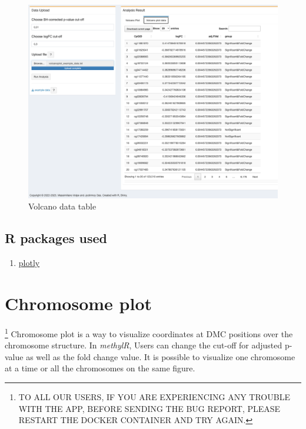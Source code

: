 \documentclass[
  a4paper,
  oneside,
  open=any]{scrreport}
\providecommand{\tightlist}{%
  \setlength{\itemsep}{0pt}\setlength{\parskip}{0pt}}\usepackage{longtable,booktabs,array}
\begin{document}
\begin{figure}[H]

{\centering \includegraphics{./_images/Volcano2.png}

}

\caption{Volcano data table}

\end{figure}

\hypertarget{r-packages-used-3}{%
\section{R packages used}\label{r-packages-used-3}}

\begin{enumerate}
\def\labelenumi{\arabic{enumi}.}
\tightlist
\item
  \href{https://cran.r-project.org/web/packages/plotly/plotly.pdf}{plotly}
\end{enumerate}

\hypertarget{sec-chromosome}{%
\chapter{Chromosome plot}\label{sec-chromosome}}

\footnote{TO ALL OUR USERS, IF YOU ARE EXPERIENCING ANY TROUBLE WITH THE
  APP, BEFORE SENDING THE BUG REPORT, PLEASE RESTART THE DOCKER
  CONTAINER AND TRY AGAIN.} Chromosome plot is a way to visualize
coordinates at DMC positions over the chromosome structure. In
\emph{methylR}, Users can change the cut-off for adjusted p-value as
well as the fold change value. It is possible to visualize one
chromosome at a time or all the chromosomes on the same figure.
\end{document}
